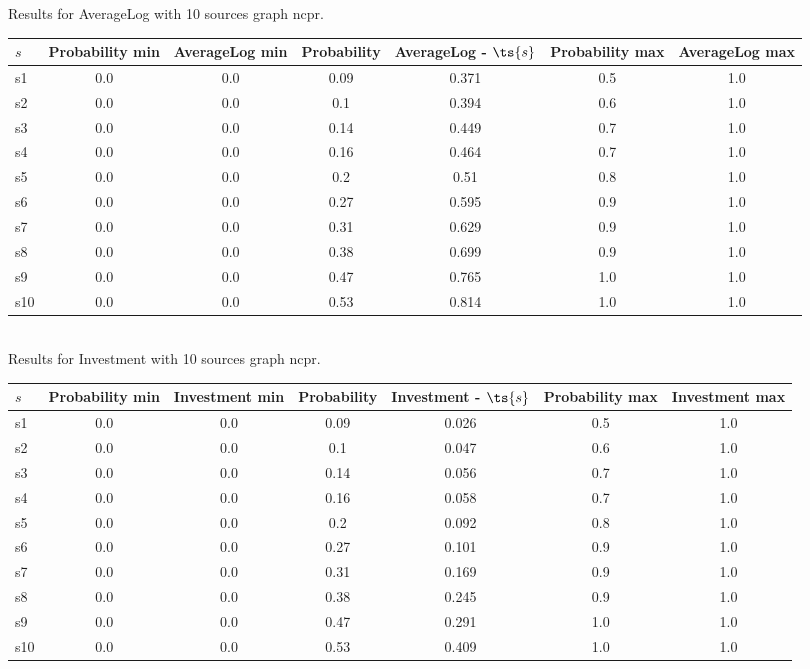 \documentclass{article}
\begin{document}
\noindent Results for AverageLog with 10 sources graph ncpr.

\noindent\begin{tabular}{|l|c|c|c|c|c|c|}
\hline
$s$& Probability min & AverageLog min & Probability & AverageLog - $\ts{s}$ & Probability max & AverageLog max\\
\hline
s1 &0.0 & 0.0 & 0.09 & 0.371 & 0.5 & 1.0\\
\hline
s2 &0.0 & 0.0 & 0.1 & 0.394 & 0.6 & 1.0\\
\hline
s3 &0.0 & 0.0 & 0.14 & 0.449 & 0.7 & 1.0\\
\hline
s4 &0.0 & 0.0 & 0.16 & 0.464 & 0.7 & 1.0\\
\hline
s5 &0.0 & 0.0 & 0.2 & 0.51 & 0.8 & 1.0\\
\hline
s6 &0.0 & 0.0 & 0.27 & 0.595 & 0.9 & 1.0\\
\hline
s7 &0.0 & 0.0 & 0.31 & 0.629 & 0.9 & 1.0\\
\hline
s8 &0.0 & 0.0 & 0.38 & 0.699 & 0.9 & 1.0\\
\hline
s9 &0.0 & 0.0 & 0.47 & 0.765 & 1.0 & 1.0\\
\hline
s10 &0.0 & 0.0 & 0.53 & 0.814 & 1.0 & 1.0\\
\hline
\end{tabular}\\

\noindent Results for Investment with 10 sources graph ncpr.

\noindent\begin{tabular}{|l|c|c|c|c|c|c|}
\hline
$s$& Probability min & Investment min & Probability & Investment - $\ts{s}$ & Probability max & Investment max\\
\hline
s1 &0.0 & 0.0 & 0.09 & 0.026 & 0.5 & 1.0\\
\hline
s2 &0.0 & 0.0 & 0.1 & 0.047 & 0.6 & 1.0\\
\hline
s3 &0.0 & 0.0 & 0.14 & 0.056 & 0.7 & 1.0\\
\hline
s4 &0.0 & 0.0 & 0.16 & 0.058 & 0.7 & 1.0\\
\hline
s5 &0.0 & 0.0 & 0.2 & 0.092 & 0.8 & 1.0\\
\hline
s6 &0.0 & 0.0 & 0.27 & 0.101 & 0.9 & 1.0\\
\hline
s7 &0.0 & 0.0 & 0.31 & 0.169 & 0.9 & 1.0\\
\hline
s8 &0.0 & 0.0 & 0.38 & 0.245 & 0.9 & 1.0\\
\hline
s9 &0.0 & 0.0 & 0.47 & 0.291 & 1.0 & 1.0\\
\hline
s10 &0.0 & 0.0 & 0.53 & 0.409 & 1.0 & 1.0\\
\hline
\end{tabular}\\
\end{document}
